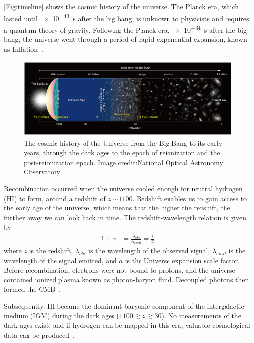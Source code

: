 \autoref{Fig:timeline} shows the cosmic history of the universe. The Planck era, which lasted until \SI{e-43}{s} after the big bang, is unknown to physicists and requires a quantum theory of gravity. Following the Planck era, \SI{e-34}{s} after the big bang, the universe went through a period of rapid exponential expansion, known as Inflation~\citep{1981PhRvD..23..347G}.

\begin{figure}
	\begin{center}
		\includegraphics[width=\linewidth]{Figures/Reionizationtimeline}
		\caption{The cosmic history of the Universe from the Big Bang to its early years, through the dark ages to the epoch of reionization and the post-reionization epoch. Image credit:National Optical Astronomy Observatory}
		\label{Fig:timeline}
	\end{center}
\end{figure} 

Recombination occurred when the universe cooled enough for neutral hydrogen (HI) to form, around a redshift of $z$ $\sim1100$. Redshift enables us to gain access to the early age of the universe, which means that the higher the redshift, the further away we can look back in time. The redshift-wavelength relation is given by
\begin{equation}
\begin{split}
1+z & = \frac{\lambda_{obs}}{\lambda_{emit}}= \frac{1}{a}
\end{split}
\end{equation}
where $z$ is the redshift, $\lambda_{obs}$ is the wavelength of the observed signal, $\lambda_{emit}$ is the wavelength of the signal emitted, and $a$ is the Universe expansion scale factor. Before recombination, electrons were not bound to protons, and the universe contained ionized plasma known as photon-baryon fluid. Decoupled photons then formed the CMB~\citep{1965ApJ...142..419P}.

Subsequently, HI became the dominant baryonic component of the intergalactic medium (IGM) during the dark ages ($1100 \gtrsim z \gtrsim 30$). No measurements of the dark ages exist, and if hydrogen can be mapped in this era, valuable cosmological data can be produced~\citep{11, 2004PhRvL..92u1301L}.

